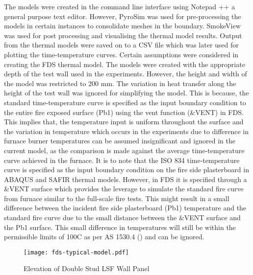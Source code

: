 The models were created in the command line interface using Notepad ++ a general purpose text editor. However, PyroSim was used for pre-processing the models in certain instances to consolidate meshes in the boundary. SmokeView was used for post processing and visualising the thermal model results. Output from the thermal models were saved on to a CSV file which was later used for plotting the time-temperature curves. Certain assumptions were considered in creating the FDS thermal model. The models were created with the appropriate depth of the test wall used in the experiments. However, the height and width of the model was restricted to 200 mm. The variation in heat transfer along the height of the test wall was ignored for simplifying the model. This is because, the standard time-temperature curve is specified as the input boundary condition to the entire fire exposed surface (Pb1) using the vent function (\&VENT) in FDS. This implies that, the temperature input is uniform throughout the surface and the variation in temperature which occurs in the experiments due to difference in furnace burner temperatures can be assumed insignificant and ignored in the current model, as the comparison is made against the average time-temperature curve achieved in the furnace. It is to note that the ISO 834 time-temperature curve is specified as the input boundary condition on the fire side plasterboard in ABAQUS and SAFIR thermal models. However, in FDS it is specified through a \&VENT surface which provides the leverage to simulate the standard fire curve from furnace similar to the full-scale fire tests. This might result in a small difference between the incident fire side plasterboard (Pb1) temperature and the standard fire curve due to the small distance between the \&VENT surface and the Pb1 surface. This small difference in temperatures will still be within the permissible limits of 100\degree C as per AS 1530.4 (\citet{StandardsAustral2014}) and can be ignored.
\begin{figure}[!htbp]
	\centering
		\texttt{[image: fds-typical-model.pdf]}
		\caption{Elevation of Double Stud LSF Wall Panel}
		\label{fig:fds-typical-model}
\end{figure}

